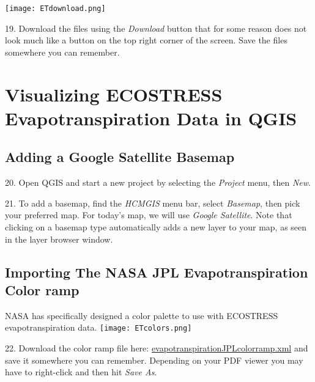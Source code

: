 \documentclass[oneside,a4paper,11pt,explicit]{book}
\begin{document}
\vspace{.5em}

\centerline{\texttt{[image: ETdownload.png]}}

\vspace{.5em}


19. Download the files using the \textit{Download} button that for some reason does not look much like a button on the top right corner of the screen. Save the files somewhere you can remember. 

\section{Visualizing ECOSTRESS Evapotranspiration Data in QGIS}

\subsection{Adding a Google Satellite Basemap}

20. Open QGIS and start a new project by selecting the \textit{Project} menu, then \textit{New}.

21. To add a basemap, find the \textit{HCMGIS} menu bar, select \textit{Basemap}, then pick your preferred map. For today's map, we will use \textit{Google Satellite}. Note that clicking on a basemap type automatically adds a new layer to your map, as seen in the layer browser window.

\subsection{Importing The NASA JPL Evapotranspiration Color ramp}

NASA has specifically designed a color palette to use with ECOSTRESS evapotranspiration data. \texttt{[image: ETcolors.png]} 

\vspace{.5em}

22. Download the color ramp file here: \href{https://jeremydforsythe.github.io/icecream-tutorials/Tutorial6_Evaportranspiration1/evapotranspirationJPLcolorramp.xml}{evapotranspirationJPLcolorramp.xml} and save it somewhere you can remember. Depending on your PDF viewer you may have to right-click and then hit \textit{Save As}.
\end{document}
